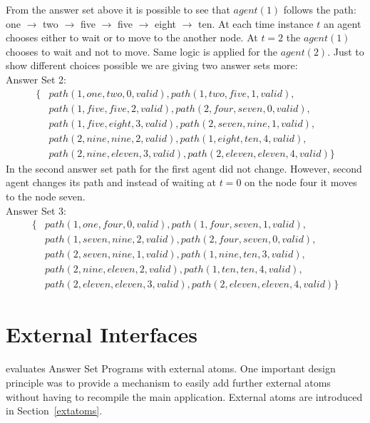 \documentclass[14pt,a4paper, titlepage]{article}
\begin{document}
From the answer set above it is possible to see that 
$\mathit{agent(1)}$ follows the path:
one $\rightarrow$ two $\rightarrow$ five $\rightarrow$ five 
$\rightarrow$ eight $\rightarrow$ ten. At each time 
instance $t$ an agent chooses either to wait or to move to 
the another node. At $t=2$ the $\mathit{agent(1)}$ chooses 
to wait and not to move. Same logic is applied for the 
$\mathit{agent(2)}$. Just to show different choices 
possible we are 
giving two answer sets more:
\\Answer Set 2:
\begin{align*}
\{ & path(1,one,two,0,valid),path(1,two,five,1,valid),
\\ & path(1,five,five,2,valid),path(2,four,seven,0,valid),
\\ & path(1,five,eight,3,valid),path(2,seven,nine,1,valid),
\\ & path(2,nine,nine,2,valid),path(1,eight,ten,4,valid),
\\ & 
path(2,nine,eleven,3,valid),path(2,eleven,eleven,4,valid)\}
\end{align*}
In the second answer set path for the first agent did not 
change. However, second agent changes its path and instead 
of waiting at $t=0$ on the node four it moves to the node 
seven.  
\\Answer Set 3:
\begin{align*}
\{ & path(1,one,four,0,valid), path(1,four,seven,1,valid),
\\ & path(1,seven,nine,2,valid), path(2,four,seven,0,valid),
\\ & path(2,seven,nine,1,valid), 
path(1,nine,ten,3,valid),
\\ & path(2,nine,eleven,2,valid), path(1,ten,ten,4,valid),
\\ & 
path(2,eleven,eleven,3,valid),path(2,eleven,eleven,4,valid) 
\}
\end{align*} 

\section{External Interfaces}
\label{sec:externalInterfaces}
\dlvhex{} evaluates Answer Set Programs with external 
atoms. One important design principle was to provide a 
mechanism to easily add further external atoms without 
having to recompile the main application. External atoms are introduced in Section~\ref{extatoms}.
 
\end{document}
